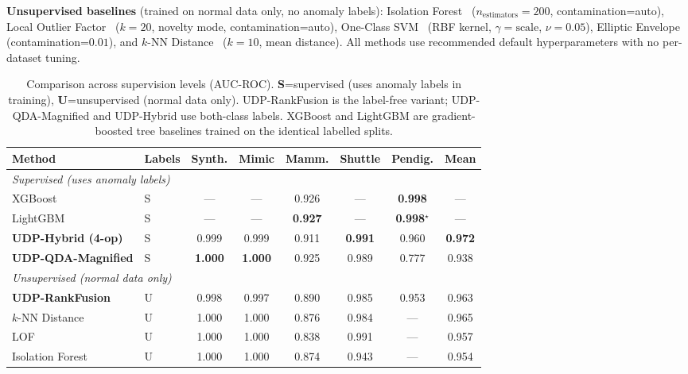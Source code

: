 \documentclass[journal]{IEEEtran}
\begin{document}
\textbf{Unsupervised baselines} (trained on normal data only, no anomaly labels): Isolation Forest~\cite{liu2008isolation} ($n_{\text{estimators}}=200$, contamination=auto), Local Outlier Factor~\cite{breunig2000lof} ($k=20$, novelty mode, contamination=auto), One-Class SVM~\cite{scholkopf2001estimating} (RBF kernel, $\gamma=\text{scale}$, $\nu=0.05$), Elliptic Envelope~\cite{rousseeuw1999fast} (contamination=$0.01$), and $k$-NN Distance~\cite{ramaswamy2000efficient} ($k=10$, mean distance). All methods use recommended default hyperparameters with no per-dataset tuning.

\begin{table}[t]
\centering
\caption{Comparison across supervision levels (AUC-ROC).  \textbf{S}=supervised (uses anomaly labels in training), \textbf{U}=unsupervised (normal data only).  UDP-RankFusion is the label-free variant; UDP-QDA-Magnified and UDP-Hybrid use both-class labels. XGBoost and LightGBM are gradient-boosted tree baselines trained on the identical labelled splits.}
\label{tab:sota}
\begin{threeparttable}
\begin{tabular}{@{}llcccccc@{}}
\toprule
\textbf{Method} & \textbf{Labels} & \textbf{Synth.} & \textbf{Mimic} & \textbf{Mamm.} & \textbf{Shuttle} & \textbf{Pendig.} & \textbf{Mean} \\
\midrule
\multicolumn{8}{l}{\textit{Supervised (uses anomaly labels)}} \\
XGBoost~\cite{chen2016xgboost} & S & --- & --- & 0.926 & --- & \textbf{0.998} & --- \\
LightGBM~\cite{ke2017lightgbm} & S & --- & --- & \textbf{0.927} & --- & \textbf{0.998}$^\star$ & --- \\
\textbf{UDP-Hybrid (4-op)} & S & 0.999 & 0.999 & 0.911 & \textbf{0.991} & 0.960 & \textbf{0.972} \\
\textbf{UDP-QDA-Magnified} & S & \textbf{1.000} & \textbf{1.000} & 0.925 & 0.989 & 0.777 & 0.938 \\
\midrule
\multicolumn{8}{l}{\textit{Unsupervised (normal data only)}} \\
\textbf{UDP-RankFusion} & U & 0.998 & 0.997 & 0.890 & 0.985 & 0.953 & 0.963 \\
$k$-NN Distance~\cite{ramaswamy2000efficient} & U & 1.000 & 1.000 & 0.876 & 0.984 & --- & 0.965 \\
LOF~\cite{breunig2000lof} & U & 1.000 & 1.000 & 0.838 & 0.991 & --- & 0.957 \\
Isolation Forest~\cite{liu2008isolation} & U & 1.000 & 1.000 & 0.874 & 0.943 & --- & 0.954 \\

\end{tabular}
\end{threeparttable}
\end{table}
\end{document}
